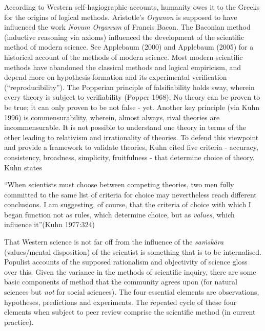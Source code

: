 According to Western self-hagiographic accounts, humanity owes it to the Greeks for the origins of logical methods. Aristotle's {\sl Organon} is supposed to have influenced the work {\sl Novum Organum} of Francis Bacon.  The Baconian method (inductive reasoning via axioms) influenced the development of the scientific method of modern science. See Applebaum (2000) and Applebaum (2005) for a historical account of the methods of modern science. Most modern scientific methods have abandoned the classical methods and logical empiricism, and depend more on hypothesis-formation and its experimental verification (``reproducibility''). The Popperian principle of falsifiability holds sway, wherein every theory is subject to verifiability (Popper 1968): No theory can be proven to be true; it can only proven to be not false - yet.  Another key principle (via Kuhn 1996) is commensurability, wherein, almost always, rival theories are incommensurable. It is not possible to understand one theory in terms of the other leading to relativism and irrationality of theories. To defend this viewpoint and provide a framework to validate theories, Kuhn cited five criteria - accuracy, consistency, broadness, simplicity, fruitfulness - that determine choice of theory. Kuhn states
\begin{myquote}
``When scientists must choose between competing theories, two men fully committed to the same list of criteria for choice may nevertheless reach different conclusions. I am suggesting, of course, that the criteria of choice with which I began function not as rules, which determine choice, but as {\sl values}, which influence it''\hfill (Kuhn 1977:324)
\end{myquote}

That Western science is not far off from the influence of the {{\sl saṁskāra}\relax} (values/mental disposition) of the scientist is something that is to be internalised. Populist accounts of the supposed rationalism and objectivity of science gloss over this. Given the variance in the methods of scientific inquiry, there are some basic components of method that the community agrees upon (for natural sciences but {\sl not} for social sciences). The four essential elements are observations, hypotheses, predictions and experiments. The repeated cycle of these four elements when subject to peer review comprise the scientific method (in current practice).


